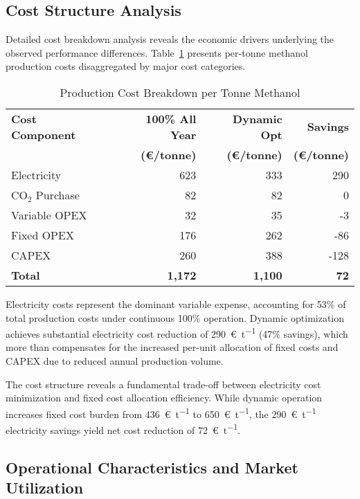 \documentclass[12pt,a4paper]{article}
\begin{document}
\subsection{Cost Structure Analysis}

Detailed cost breakdown analysis reveals the economic drivers underlying the observed performance differences. Table~\ref{tab:cost_breakdown} presents per-tonne methanol production costs disaggregated by major cost categories.

\begin{table}[H]
\centering
\caption{Production Cost Breakdown per Tonne Methanol}
\label{tab:cost_breakdown}
\begin{tabular}{@{}lrrr@{}}
\toprule
\textbf{Cost Component} & \textbf{100\% All Year} & \textbf{Dynamic Opt} & \textbf{Savings} \\
& \textbf{(€/tonne)} & \textbf{(€/tonne)} & \textbf{(€/tonne)} \\
\midrule
Electricity & 623 & 333 & 290 \\
CO$_2$ Purchase & 82 & 82 & 0 \\
Variable OPEX & 32 & 35 & -3 \\
Fixed OPEX & 176 & 262 & -86 \\
CAPEX & 260 & 388 & -128 \\
\midrule
\textbf{Total} & \textbf{1,172} & \textbf{1,100} & \textbf{72} \\
\bottomrule
\end{tabular}
\end{table}

Electricity costs represent the dominant variable expense, accounting for 53\% of total production costs under continuous 100\% operation. Dynamic optimization achieves substantial electricity cost reduction of \SI{290}{\euro\per\tonne} (47\% savings), which more than compensates for the increased per-unit allocation of fixed costs and CAPEX due to reduced annual production volume.

The cost structure reveals a fundamental trade-off between electricity cost minimization and fixed cost allocation efficiency. While dynamic operation increases fixed cost burden from \SI{436}{\euro\per\tonne} to \SI{650}{\euro\per\tonne}, the \SI{290}{\euro\per\tonne} electricity savings yield net cost reduction of \SI{72}{\euro\per\tonne}.

\subsection{Operational Characteristics and Market Utilization}
\end{document}
